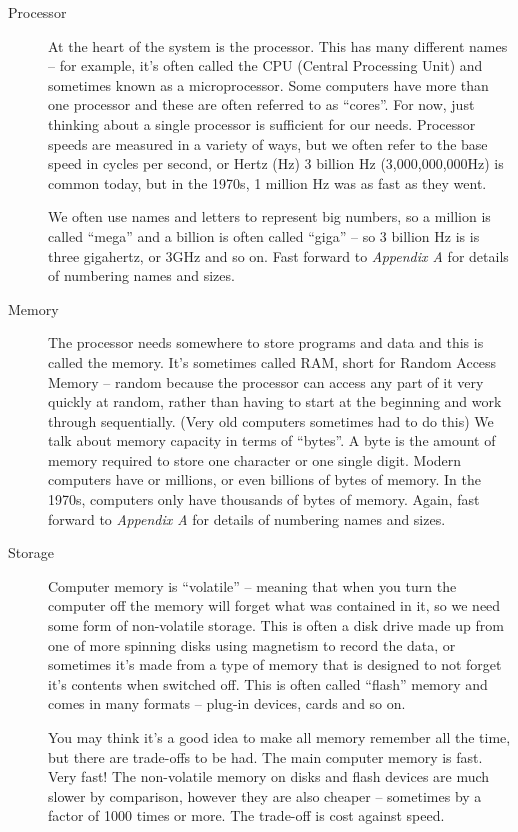 \begin{description}

\item[Processor] At the heart of the system is the processor. This
has many different names -- for example, it's often called the CPU
(Central Processing Unit) and sometimes known as a microprocessor. Some
computers have more than one processor and these are often referred to as
``cores''. For now, just thinking about a single processor is sufficient
for our needs. Processor speeds are measured in a variety of ways,
but we often refer to the base speed in cycles per second, or Hertz
(Hz) 3 billion Hz (3,000,000,000Hz) is common today, but in the 1970s,
1 million Hz was as fast as they went.

We often use names and letters to represent
big numbers, so a million is called ``mega'' and a billion is often called
``giga'' -- so 3 billion Hz is is three gigahertz, or 3GHz and so on. Fast
forward to {\em Appendix A} for details of numbering names and sizes.

\item[Memory] The processor needs somewhere to store programs and data
and this is called the memory. It's sometimes called RAM, short for
Random Access Memory -- random because the processor can access any
part of it very quickly at random, rather than having to start at the
beginning and work through sequentially. (Very old computers sometimes
had to do this) We talk about memory capacity in terms of ``bytes''. A
byte is the amount of memory required to store one character or one
single digit. Modern computers have or millions, or even billions of
bytes of memory. In the 1970s, computers only have thousands of bytes of
memory. Again, fast forward to {\em Appendix A} for details of numbering
names and sizes.

\item[Storage] Computer memory is ``volatile'' -- meaning that when you
turn the computer off the memory will forget what was contained in it,
so we need some form of non-volatile storage. This is often a disk drive
made up from one of more spinning disks using magnetism to record the
data, or sometimes it's made from a type of memory that is designed to
not forget it's contents when switched off. This is often called ``flash''
memory and comes in many formats -- plug-in devices, cards and so on.

You may think it's a good idea to make all memory remember all the time,
but there are trade-offs to be had. The main computer memory is fast. Very
fast! The non-volatile memory on disks and flash devices are much slower
by comparison, however they are also cheaper -- sometimes by a factor of
1000 times or more. The trade-off is cost against speed.


\end{description}
